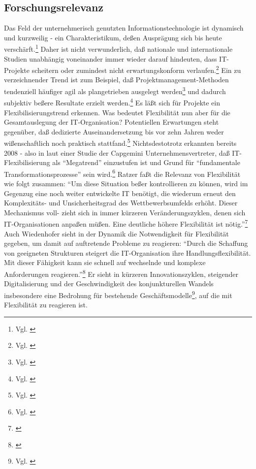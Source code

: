 \subsection{Forschungsrelevanz}
Das Feld der unternehmerisch genutzten Informationstechnologie ist dynamisch und kurzweilig - ein Charakteristikum, de{\ss}en Auspr\"agung sich bis heute versch\"arft.\footnote{Vgl. \cite[S.15]{capgemini2019}} 
Daher ist nicht verwunderlich, da{\ss} nationale und internationale Studien unabh\"angig voneinander immer wieder darauf hindeuten, dass IT-Projekte scheitern oder zumindest nicht erwartungskonform verlaufen.\footnote{Vgl. \cite[S.172]{fischer2016}}\newline
Ein zu verzeichnender Trend ist zum Beispiel, da{\ss} Projektmanagement-Methoden tendenziell h\"aufiger agil als plangetrieben ausgelegt werden\footnote{Vgl. \cite[S.12]{statusquoagile2015}} und dadurch subjektiv be{\ss}ere Resultate erzielt werden.\footnote{Vgl. \cite[S.22]{statusquoagile2015}} 
Es l\"a{\ss}t sich f\"ur Projekte ein Flexibilisierungstrend erkennen.\newline
Was bedeutet Flexibilit\"at nun aber f\"ur die Gesamtauslegung der IT-Organisation?
Potentiellen Erwartungen steht gegen\"uber, da{\ss} dedizierte Auseinandersetzung bis vor zehn Jahren weder wi{\ss}enschaftlich noch praktisch stattfand.\footnote{Vgl. \cite[S.53]{radermacher2009}} 
Nichtsdestotrotz erkannten bereits 2008 - also in laut einer Studie der Capgemini Unternehmensvertreter, da{\ss} IT-Flexibilisierung als ``Megatrend'' einzustufen ist und Grund f\"ur ``fundamentale Transformationsprozesse'' sein wird.\footnote{Vgl. \cite[S.17]{capgemini2008}}
Ratzer fa{\ss}t die Relevanz von Flexibilit\"at wie folgt zusammen: ``Um diese Situation be{\ss}er kontrollieren zu k\"onnen, wird im Gegenzug eine noch weiter entwickelte IT ben\"otigt, die wiederum erneut den Komplexit\"ats- und Unsicherheitsgrad des Wettbewerbsumfelds erh\"oht. 
Dieser Mechanismus voll- zieht sich in immer k\"urzeren Ver\"anderungszyklen, denen sich IT-Organisationen anpa{\ss}en m\"u{\ss}en. 
Eine deutliche h\"ohere Flexibilit\"at ist n\"otig.''\footnote{\cite{ratzer2009}}
Auch Wiedenhofer sieht in der Dynamik die Notwendigkeit f\"ur Flexibilit\"at gegeben, um damit auf auftretende Probleme zu reagieren: ``Durch die Schaffung von geeigneten Strukturen steigert die IT-Organisation ihre Handlungsflexibilit\"at. 
Mit dieser F\"ahigkeit kann sie schnell auf wechselnde und komplexe Anforderungen reagieren.''\footnote{\cite[S.236]{Wiedenhofer2016}}
Er sieht in k\"urzeren Innovationszyklen, steigender Digitalisierung und der Geschwindigkeit des konjunkturellen Wandels insbesondere eine Bedrohung f\"ur bestehende Gesch\"aftsmodelle\footnote{Vgl. \cite[S.237]{Wiedenhofer2016}}, auf die mit Flexibilit\"at zu reagieren ist.\newline
